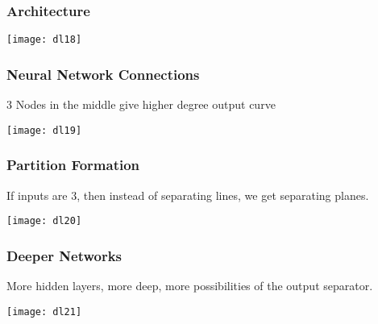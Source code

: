 \begin{frame}[fragile] \frametitle{Architecture}
\begin{center}
\texttt{[image: dl18]}
\end{center}
\end{frame}

\begin{frame}[fragile] \frametitle{Neural Network Connections}
3 Nodes in the middle give higher degree output curve
\begin{center}
\texttt{[image: dl19]}
\end{center}
\end{frame}

\begin{frame}[fragile] \frametitle{Partition Formation}
If inputs are 3, then instead of separating lines, we get separating planes.
\begin{center}
\texttt{[image: dl20]}
\end{center}
\end{frame}


\begin{frame}[fragile] \frametitle{Deeper Networks}
More hidden layers, more deep, more possibilities of the output separator.
\begin{center}
\texttt{[image: dl21]}
\end{center}
\end{frame}









